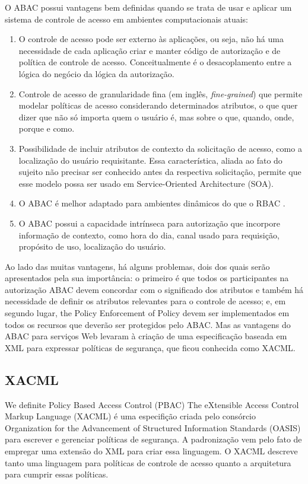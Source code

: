 \documentclass{doublecol-new}
\begin{document}
O ABAC possui vantagens bem definidas quando se trata de usar e aplicar um sistema de controle de acesso em ambientes computacionais atuais: 

\begin{enumerate}
	\item O controle de acesso pode ser externo às aplicações, ou seja, não há uma necessidade de cada aplicação criar e manter código de autorização e de política de controle de acesso. Conceitualmente é o desacoplamento entre a lógica do negócio da lógica da autorização.
	\item Controle de acesso de granularidade fina (em inglês, \textit{fine-grained}) que permite modelar políticas de acesso considerando determinados atributos, o que quer dizer que não só importa quem o usuário é, mas sobre o que, quando, onde, porque e como.
	\item Possibilidade de incluir atributos de contexto da solicitação de acesso, como a localização do usuário requisitante. Essa característica, aliada ao fato do sujeito não precisar ser conhecido antes da respectiva solicitação, permite que esse modelo possa ser usado em Service-Oriented Architecture (SOA).
	\item O ABAC é melhor adaptado para ambientes dinâmicos do que o RBAC \cite{yuan2005attributed} \cite{huABAC2014guide}.
	\item O ABAC possui a capacidade intrínseca para autorização que incorpore informação de contexto, como hora do dia, canal usado para requisição, propósito de uso, localização do usuário.
\end{enumerate}
Ao lado das muitas vantagens, há alguns problemas, dois dos quais serão apresentados pela sua importância: o primeiro é que todos os participantes na autorização ABAC devem concordar com o significado dos atributos \cite{karp2010abac} \cite{Rubio-Medrano2015federated} e também há necessidade de definir os atributos relevantes para o controle de acesso; e, em segundo lugar, the Policy Enforcement of Policy devem ser implementados em todos os recursos que deverão ser protegidos pelo ABAC. Mas as vantagens do ABAC para serviços Web levaram à criação de uma especificação baseada em XML para expressar políticas de segurança, que ficou conhecida como XACML.

\subsection{XACML}
We definite Policy Based Access Control (PBAC) 
The eXtensible Access Control Markup Language (XACML)\cite{rissanen2013extensible} é uma especifição criada pelo consórcio Organization for the Advancement of Structured Information Standards (OASIS) para escrever e gerenciar políticas de segurança. A padronização vem pelo fato de empregar uma extensão do XML para criar essa linguagem. O XACML descreve tanto uma linguagem para políticas de controle de acesso quanto a arquitetura para cumprir essas políticas.
\end{document}
